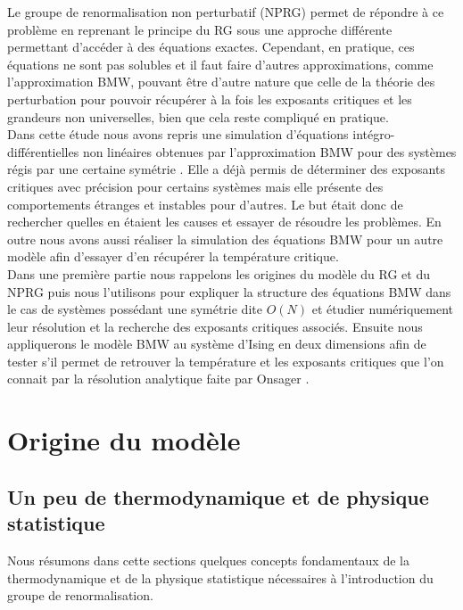 \documentclass[10pt]{article}
\begin{document}
\begin{multicols}{2}
Le groupe de renormalisation non perturbatif (NPRG) permet de répondre à ce problème en reprenant le principe du RG sous une approche différente permettant d'accéder à des équations exactes. Cependant, en pratique, ces équations ne sont pas solubles et il faut faire d'autres approximations, comme l'approximation BMW, pouvant être d'autre nature que celle de la théorie des perturbation pour pouvoir récupérer à la fois les exposants critiques et les grandeurs non universelles, bien que cela reste compliqué en pratique. \\

Dans cette étude nous avons repris une simulation d'équations intégro-différentielles non linéaires obtenues par l'approximation BMW pour des systèmes régis par une certaine symétrie \cite{LeonardThesis}. Elle  a déjà permis de déterminer des exposants critiques avec précision pour certains systèmes mais elle présente des comportements étranges et instables pour d'autres. Le but était donc de rechercher quelles en étaient les causes et essayer de résoudre les problèmes. En outre nous avons aussi réaliser la simulation des équations BMW pour un autre modèle afin d'essayer d'en récupérer la température critique.  \\

Dans une première partie nous rappelons les origines du modèle du RG et du NPRG puis nous l'utilisons pour expliquer la structure des équations BMW dans le cas de systèmes possédant une symétrie dite $O(N)$ et étudier numériquement leur résolution et la recherche des exposants critiques associés. Ensuite nous appliquerons le modèle BMW au système d'Ising en deux dimensions afin de tester s'il permet de retrouver la température et les exposants critiques que l'on connait par la résolution analytique faite par Onsager \cite{Onsager}. 


\vspace*{11pt}



\section{Origine du modèle}
\subsection{Un peu de thermodynamique et de physique statistique}

Nous résumons dans cette sections quelques concepts fondamentaux de la thermodynamique et de la physique statistique \cite{diu2007thermodynamique} nécessaires à l'introduction du groupe de renormalisation. \\


\end{multicols}
\end{document}

